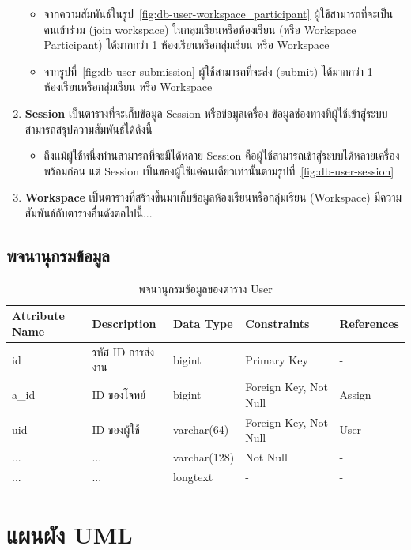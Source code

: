 \begin{enumerate}
\begin{itemize}
                \item จากความสัมพันธ์ในรูป~\ref{fig:db-user-workspace_participant} ผู้ใช้สามารถที่จะเป็นคนเข้าร่วม (join workspace) ในกลุ่มเรียนหรือห้องเรียน (หรือ Workspace Participant) ได้มากกว่า 1 ห้องเรียนหรือกลุ่มเรียน หรือ Workspace
                \item จากรูปที่~\ref{fig:db-user-submission} ผู้ใช้สามารถที่จะส่ง (submit) ได้มากกว่า 1 ห้องเรียนหรือกลุ่มเรียน หรือ Workspace
            \end{itemize}
        \item \textbf{Session}
            เป็นตารางที่จะเก็บข้อมูล Session หรือข้อมูลเครื่อง ข้อมูลช่องทางที่ผู้ใช้เข้าสู่ระบบ สามารถสรุปความสัมพันธ์ได้ดังนี้
            \begin{itemize}
                \item ถึงเเม้ผู้ใช้หนึ่งท่านสามารถที่จะมีได้หลาย Session คือผู้ใช้สามารถเข้าสู่ระบบได้หลายเครื่องพร้อมก่อน แต่ Session เป็นของผู้ใช้แค่คนเดียวเท่านั้นตามรูปที่~\ref{fig:db-user-session}
            \end{itemize}
        \item \textbf{Workspace}
            เป็นตารางที่สร้างขึ้นมาเก็บข้อมูลห้องเรียนหรือกลุ่มเรียน (Workspace) มีความสัมพันธ์กับตารางอื่นดังต่อไปนี้...
   \end{enumerate} 
    \subsection{พจนานุกรมข้อมูล}
        \begin{table}[H]
            \centering
            \caption{พจนานุกรมข้อมูลของตาราง User}\label{tbl:data-dict-user}
            \begin{tabular}{p{2cm}|p{4cm}p{2cm}p{3cm}p{2cm}} \hline\hline
                Attribute Name & Description & Data Type & Constraints & References \\ \hline\hline
                id & รหัส ID การส่งงาน & bigint & Primary Key & - \\
                a\_id & ID ของโจทย์ & bigint & Foreign Key, Not Null & Assign \\
                uid & ID ของผู้ใช้ & varchar(64) & Foreign Key, Not Null & User \\
                ... & ... & varchar(128) & Not Null & - \\
                ... & ... & longtext & - & - \\ \hline\hline
            \end{tabular}   
        \end{table}
    \pagebreak
\section{แผนผัง UML}
\pagebreak